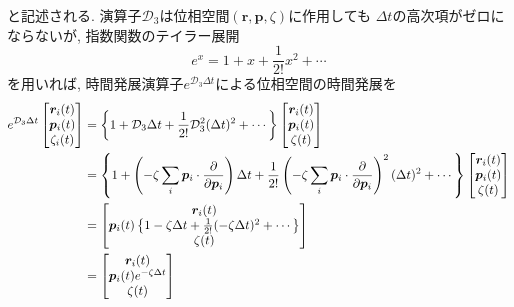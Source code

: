 と記述される. 演算子$\mathcal{D}_{3}$は位相空間$(\bm{r},\bm{p},\zeta)$に作用しても
$\Delta t$の高次項がゼロにならないが, 指数関数のテイラー展開
\begin{equation}
 e^{x} = 1 + x + \frac{1}{2!} x^{2} + \cdots
\end{equation}
を用いれば, 時間発展演算子$e^{\mathcal{D}_{3} \Delta t}$による位相空間の時間発展を
\begin{align}
 e^{\mathcal{D}_{3} \Delta t}
 \begin{bmatrix}
  \bm{r}_{i} (t) \\
  \bm{p}_{i} (t) \\
  \zeta_{i} (t) \\
 \end{bmatrix}
 &= \left\{
    1 + \mathcal{D}_{3} \Delta t
    + \frac{1}{2!} \mathcal{D}_{3}^{2} (\Delta t)^{2}
    + \cdots
    \right\}
 \begin{bmatrix}
  \bm{r}_{i} (t) \\
  \bm{p}_{i} (t) \\
  \zeta (t) \\
 \end{bmatrix}
 \notag \\
 &= \left\{
    1
    + \left(
      -\zeta \sum_{i} \bm{p}_{i}\cdot \frac{\partial}{\partial \bm{p}_{i}}
      \right)
    \Delta t
    + \frac{1}{2!}
      \left(
      -\zeta \sum_{i} \bm{p}_{i}\cdot \frac{\partial}{\partial \bm{p}_{i}}
      \right)^{2}
      (\Delta t)^{2}
    + \cdots
    \right\}
 \begin{bmatrix}
  \bm{r}_{i} (t) \\
  \bm{p}_{i} (t) \\
  \zeta (t) \\
 \end{bmatrix}
 \notag \\
 &=
 \begin{bmatrix}
  \bm{r}_{i} (t) \\
  \bm{p}_{i} (t)
  \left\{
  1 - \zeta \Delta t + \frac{1}{2!} (-\zeta \Delta t)^{2} + \cdots
  \right\} \\
  \zeta (t) \\
 \end{bmatrix}
 \notag \\
 &=
 \begin{bmatrix}
  \bm{r}_{i} (t) \\
  \bm{p}_{i} (t) e^{- \zeta \Delta t} \\
  \zeta (t) \\
 \end{bmatrix}
 \label{eq:NoseHoover36}
\end{align}
